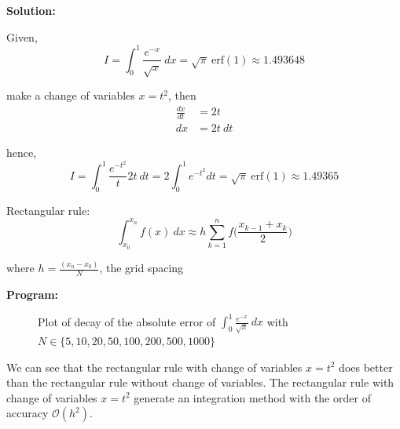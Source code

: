 \documentclass[a4paper,11pt]{report}
\begin{document}
\begin{enumerate}
    \textbf{Solution:}
    
    Given,
    \begin{equation*}
    I = \int_{0}^{1} \frac{e^{-x}}{\sqrt{x}}\ dx = \sqrt{\pi}\ \text{erf}(1) 
    \approx 1.493648
    \end{equation*}

    make a change of variables $x = t^{2}$, then 
    \begin{equation*}
    \begin{aligned}
    \frac{dx}{dt} &= 2t \\
    dx &= 2t\ dt
    \end{aligned}
    \end{equation*}
    
    hence, 
    \begin{equation*}
    I = \int_{0}^{1} \frac{e^{-t^{2}}}{t} 2t\ dt = 2 \int_{0}^{1} e^{-t^{2}} dt
    = \sqrt{\pi}\ \text{erf}(1) \approx 1.49365
    \end{equation*}

    Rectangular rule:
    \begin{equation*}
    \int_{x_{0}}^{x_{n}} f(x)\ dx \approx h \sum_{k=1}^{n} 
    f \Bigg(\frac{x_{k-1} + x_{k}}{2} \Bigg)
    \end{equation*}

    where $h = \displaystyle \frac{(x_{n} - x_{0})}{N}$, the grid spacing

    \vspace{1 cm}

    \textbf{Program:}
    

    \pagebreak

    \begin{figure}[ht!]
    \centering
    \resizebox{0.95\linewidth}{!}{}
    \caption{Plot of decay of the absolute error of $\displaystyle 
    \int_{0}^{1} \frac{e^{-x}}{\sqrt{x}}\ dx$ with $N \in \{5, 10, 20, 50, 
    100, 200, 500, 1000\}$}
    \end{figure} 

    

    \vspace{0.5cm}

    We can see that the rectangular rule with change of variables $x = t^{2}$ 
    does better than the rectangular rule without change of variables. The 
    rectangular rule with change of variables $x = t^{2}$ generate an 
    integration method with the order of accuracy $\mathcal{O}(h^{2})$.


\end{enumerate}
\end{document}
